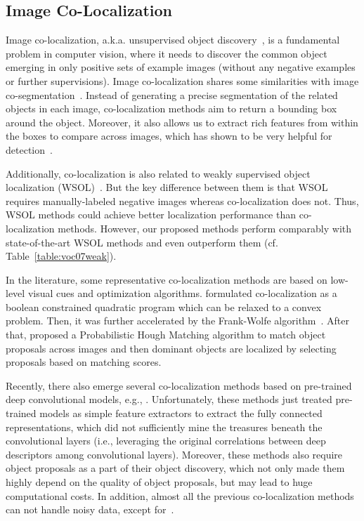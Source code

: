 \documentclass[twocolumn]{svjour3}          \smartqed  \usepackage{graphicx}
\begin{document}
\subsection{Image Co-Localization}

Image co-localization, a.k.a. unsupervised object discovery~\citep{chicvpr2015,wangiccv2015}, is a fundamental problem in computer vision, where it needs to discover the common object emerging in only positive sets of example images (without any negative examples or further supervisions). Image co-localization shares some similarities with image co-segmentation~\citep{cosegijcai,gunheeiccv2011,joulinmccvpr2010}. Instead of generating a precise segmentation of the related objects in each image, co-localization methods aim to return a bounding box around the object. Moreover, it also allows us to extract rich features from within the boxes to compare across images, which has shown to be very helpful for detection~\citep{tangcvpr2014}.

Additionally, co-localization is also related to weakly supervised object localization (WSOL)~\citep{wsolijcai,bilencvpr2015,wangeccv2014,sivacvpr2011}. But the key difference between them is that WSOL requires manually-labeled negative images whereas co-localization does not. Thus, WSOL methods could achieve better localization performance than co-localization methods. However, our proposed methods perform comparably with state-of-the-art WSOL methods and even outperform them (cf. Table~\ref{table:voc07weak}).

In the literature, some representative co-localization methods are based on low-level visual cues and optimization algorithms. \citet{tangcvpr2014} formulated co-localization as a boolean constrained quadratic program which can be relaxed to a convex problem. Then, it was further accelerated by the Frank-Wolfe algorithm~\citep{joulineccv2014}. After that, \citet{chicvpr2015} proposed a Probabilistic Hough Matching algorithm to match object proposals across images and then dominant objects are localized by selecting proposals based on matching scores.

Recently, there also emerge several co-localization methods based on pre-trained deep convolutional models, e.g., \citet{yaoeccv2016,wangeccv2014}. Unfortunately, these methods just treated pre-trained models as simple feature extractors to extract the fully connected representations, which did not sufficiently mine the treasures beneath the convolutional layers (i.e., leveraging the original correlations between deep descriptors among convolutional layers). Moreover, these methods also require object proposals as a part of their object discovery, which not only made them highly depend on the quality of object proposals, but may lead to huge computational costs. In addition, almost all the previous co-localization methods can not handle noisy data, except for~\citep{tangcvpr2014}.
\end{document}
